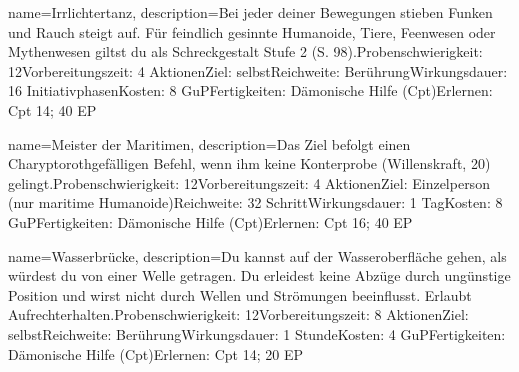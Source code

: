 {
    name={Irrlichtertanz},
    description={Bei jeder deiner Bewegungen stieben Funken und Rauch steigt auf. Für feindlich gesinnte Humanoide, Tiere, Feenwesen oder Mythenwesen giltst du als Schreckgestalt Stufe 2 (S. 98).\newline Probenschwierigkeit: 12\newline Vorbereitungszeit: 4 Aktionen\newline Ziel: selbst\newline Reichweite: Berührung\newline Wirkungsdauer: 16 Initiativphasen\newline Kosten: 8 GuP\newline Fertigkeiten: Dämonische Hilfe (Cpt)\newline Erlernen: Cpt 14; 40 EP}
}


{
    name={Meister der Maritimen},
    description={Das  Ziel befolgt einen Charyptorothgefälligen Befehl, wenn ihm keine Konterprobe (Willenskraft, 20) gelingt.\newline Probenschwierigkeit: 12\newline Vorbereitungszeit: 4 Aktionen\newline Ziel: Einzelperson (nur maritime Humanoide)\newline Reichweite: 32 Schritt\newline Wirkungsdauer: 1 Tag\newline Kosten: 8 GuP\newline Fertigkeiten: Dämonische Hilfe (Cpt)\newline Erlernen: Cpt 16; 40 EP}
}


{
    name={Wasserbrücke},
    description={Du kannst auf der Wasseroberfläche gehen, als würdest du von einer Welle getragen. Du erleidest keine Abzüge durch ungünstige Position und wirst nicht durch Wellen und Strömungen beeinflusst. Erlaubt Aufrechterhalten.\newline Probenschwierigkeit: 12\newline Vorbereitungszeit: 8 Aktionen\newline Ziel: selbst\newline Reichweite: Berührung\newline Wirkungsdauer: 1 Stunde\newline Kosten: 4 GuP\newline Fertigkeiten: Dämonische Hilfe (Cpt)\newline Erlernen: Cpt 14; 20 EP}
}


